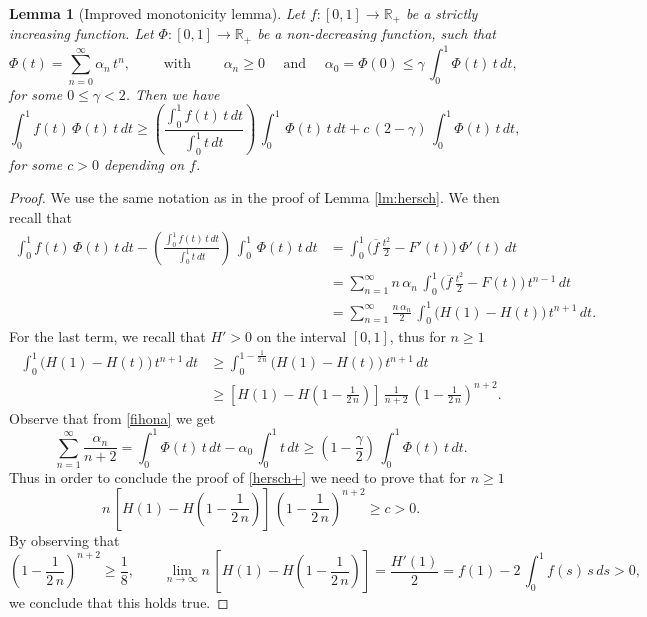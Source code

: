\documentclass{amsart}
\newtheorem{lemma}{Lemma}[section]
\theoremstyle{definition}
\numberwithin{equation}{section}
\begin{document}
\begin{lemma}[Improved monotonicity lemma]
\label{lm:hersch+}
Let $f:[0,1]\to\mathbb{R}_+$ be a strictly increasing function. Let $\Phi:[0,1]\to\mathbb{R}_+$ be a non-decreasing function, such that
\begin{equation}
\label{fihona}
\Phi(t)=\sum_{n=0}^\infty \alpha_n\,t^n,\qquad \mbox{ with }\qquad\alpha_n\ge 0\quad \mbox{ and }\quad \alpha_0=\Phi(0)\le \gamma\,\int_0^1 \Phi(t)\,t\,dt,
\end{equation}
for some $0\le \gamma<2$.
Then we have
\begin{equation}
\label{hersch+}
\displaystyle\int_0^1 f(t)\,\Phi(t)\,t\,dt\ge \left(\frac{\displaystyle\int_0^1 f(t)\,t\,dt}{\displaystyle\int_0^1 t\,dt}\right)\, \int_0^1\, \Phi(t)\,t\,dt+c\,(2-\gamma)\,\int_0^1 \Phi(t)\,t\,dt,
\end{equation}
for some $c>0$ depending on $f$.
\end{lemma}
\begin{proof}
We use the same notation as in the proof of Lemma \ref{lm:hersch}. We then recall that
\[
\begin{split}
\displaystyle\int_0^1 f(t)\,\Phi(t)\,t\,dt-\left(\frac{\displaystyle\int_0^1 f(t)\,t\,dt}{\displaystyle\int_0^1 t\,dt}\right)\, \int_0^1\, \Phi(t)\,t\,dt&=
\int_0^1 \Big(\overline f\,\frac{t^2}{2}-F'(t)\Big)\, \Phi'(t)\,dt\\
&=\sum_{n=1}^\infty n\,\alpha_n\, \int_0^1\Big(\overline f\,\frac{t^2}{2}-F(t)\Big)\,t^{n-1}\,dt\\
&=\sum_{n=1}^\infty \frac{n\,\alpha_n}{2}\, \int_0^1\Big(H(1)-H(t)\Big)\,t^{n+1}\,dt.
\end{split}
\]
For the last term, we recall that $H'>0$ on the interval $[0,1]$, thus for $n\ge 1$ 
\[
\begin{split}
\int_0^1\Big(H(1)-H(t)\Big)\,t^{n+1}\,dt&\ge\int_{0}^{1-\frac{1}{2\,n}}\Big(H(1)-H(t)\Big)\,t^{n+1}\,dt\\
&\ge \left[H(1)-H\left(1-\frac{1}{2\,n}\right)\right]\,\frac{1}{n+2}\,\left(1-\frac{1}{2\,n}\right)^{n+2}.
\end{split}
\]
Observe that from \eqref{fihona} we get
\[
\sum_{n=1}^\infty \frac{\alpha_n}{n+2}=\int_0^1 \Phi(t)\,t\,dt-\alpha_0\,\int_0^1 t\,dt\ge \left(1-\frac{\gamma}{2}\right)\,\int_0^1 \Phi(t)\,t\,dt.
\]
Thus in order to conclude the proof of \eqref{hersch+} we need to prove that for $n\ge 1$
\[
n\,\left[H(1)-H\left(1-\frac{1}{2\,n}\right)\right]\,\left(1-\frac{1}{2\,n}\right)^{n+2}\ge c>0.
\]
By observing that 
\[
\left(1-\frac{1}{2\,n}\right)^{n+2}\ge \frac{1}{8},\qquad \lim_{n\to\infty}n\,\left[H(1)-H\left(1-\frac{1}{2\,n}\right)\right]=\frac{H'(1)}{2}=f(1)-2\,\int_0^1 f(s)\,s\,ds>0,
\]
we conclude that this holds true.
\end{proof}
\end{document}
